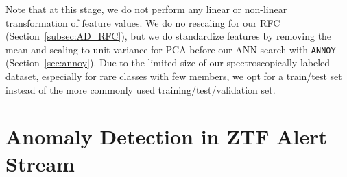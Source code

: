 \documentclass[twocolumn]{aastex63}
\begin{document}
Note that at this stage, we do not perform any linear or non-linear transformation of feature values. We do no rescaling for our RFC (Section~\ref{subsec:AD_RFC}), but we do standardize features by removing the mean and scaling to unit variance for PCA before our ANN search with \texttt{ANNOY} (Section~\ref{sec:annoy}). Due to the limited size of our spectroscopically labeled dataset, especially for rare classes with few members, we opt for a train/test set instead of the more commonly used training/test/validation set. \par



\section{Anomaly Detection in ZTF Alert Stream} \label{sec:ztf_real_time} \par
\end{document}
